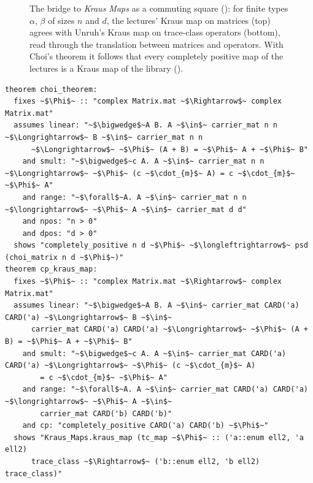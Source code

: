 \begin{figure}[t]
\centering
{}
\caption{The bridge to \emph{Kraus Maps} as a commuting square (): for finite types
$\alpha$, $\beta$ of sizes $n$ and $d$, the lectures' Kraus map on matrices (top) agrees with Unruh's Kraus map
on trace-class operators (bottom), read through the translation between matrices and operators. With
Choi's theorem it follows that every completely positive map of the lectures is a Kraus map of the
library ().}\label{fig:krausbridge}
\end{figure}

\begin{lstlisting}[float=tp,caption={Choi's theorem (Lecture 19), and the lectures' completely positive maps as Kraus maps of the AFP entry \emph{Kraus Maps}; \isa{tc\_map} reads a map of matrices as a map of trace-class operators on \isa{'a ell2}},label={lst:choi}]
theorem choi_theorem:
  fixes ~$\Phi$~ :: "complex Matrix.mat ~$\Rightarrow$~ complex Matrix.mat"
  assumes linear: "~$\bigwedge$~A B. A ~$\in$~ carrier_mat n n ~$\Longrightarrow$~ B ~$\in$~ carrier_mat n n
      ~$\Longrightarrow$~ ~$\Phi$~ (A + B) = ~$\Phi$~ A + ~$\Phi$~ B"
    and smult: "~$\bigwedge$~c A. A ~$\in$~ carrier_mat n n ~$\Longrightarrow$~ ~$\Phi$~ (c ~$\cdot_{m}$~ A) = c ~$\cdot_{m}$~ ~$\Phi$~ A"
    and range: "~$\forall$~A. A ~$\in$~ carrier_mat n n ~$\longrightarrow$~ ~$\Phi$~ A ~$\in$~ carrier_mat d d"
    and npos: "n > 0"
    and dpos: "d > 0"
  shows "completely_positive n d ~$\Phi$~ ~$\longleftrightarrow$~ psd (choi_matrix n d ~$\Phi$~)"
theorem cp_kraus_map:
  fixes ~$\Phi$~ :: "complex Matrix.mat ~$\Rightarrow$~ complex Matrix.mat"
  assumes linear: "~$\bigwedge$~A B. A ~$\in$~ carrier_mat CARD('a) CARD('a) ~$\Longrightarrow$~ B ~$\in$~
      carrier_mat CARD('a) CARD('a) ~$\Longrightarrow$~ ~$\Phi$~ (A + B) = ~$\Phi$~ A + ~$\Phi$~ B"
    and smult: "~$\bigwedge$~c A. A ~$\in$~ carrier_mat CARD('a) CARD('a) ~$\Longrightarrow$~ ~$\Phi$~ (c ~$\cdot_{m}$~ A)
        = c ~$\cdot_{m}$~ ~$\Phi$~ A"
    and range: "~$\forall$~A. A ~$\in$~ carrier_mat CARD('a) CARD('a) ~$\longrightarrow$~ ~$\Phi$~ A ~$\in$~
        carrier_mat CARD('b) CARD('b)"
    and cp: "completely_positive CARD('a) CARD('b) ~$\Phi$~"
  shows "Kraus_Maps.kraus_map (tc_map ~$\Phi$~ :: ('a::enum ell2, 'a ell2)
      trace_class ~$\Rightarrow$~ ('b::enum ell2, 'b ell2) trace_class)"
\end{lstlisting}

